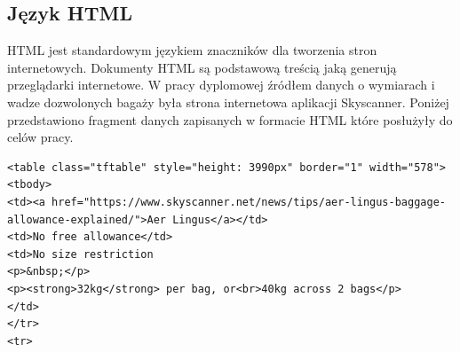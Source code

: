 \documentclass[12pt, twoside]{report}
\begin{document}
\subsection{Język HTML}
HTML jest standardowym językiem znaczników dla tworzenia stron internetowych\cite{html}. Dokumenty HTML są podstawową treścią jaką generują przeglądarki internetowe. W pracy dyplomowej źródłem danych o wymiarach i wadze dozwolonych bagaży była strona internetowa aplikacji Skyscanner. Poniżej przedstawiono fragment danych zapisanych w formacie HTML które posłużyły do celów pracy.
\begin{lstlisting}[language=HTML5, caption= Fragment dokumentu HTML]
<table class="tftable" style="height: 3990px" border="1" width="578">
<tbody>
<td><a href="https://www.skyscanner.net/news/tips/aer-lingus-baggage-allowance-explained/">Aer Lingus</a></td>
<td>No free allowance</td>
<td>No size restriction
<p>&nbsp;</p>
<p><strong>32kg</strong> per bag, or<br>40kg across 2 bags</p>
</td>
</tr>
<tr>
\end{lstlisting}

\newpage
\end{document}
